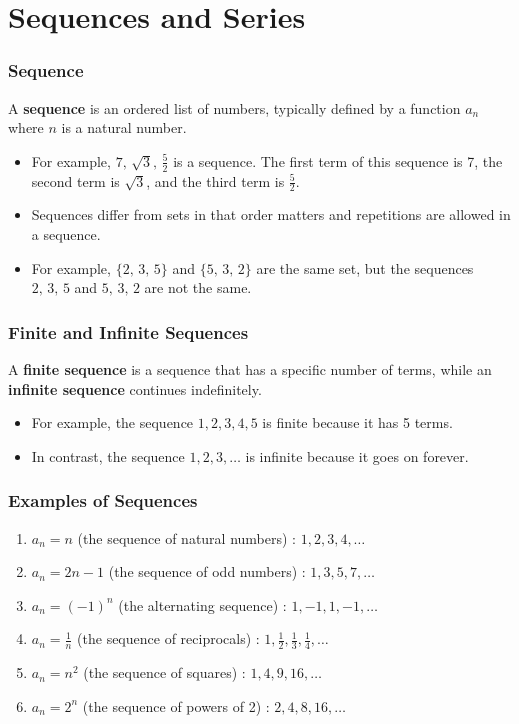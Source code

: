 \section{Sequences and Series}
\label{sec:sequence-series}

\begin{frame}
    \frametitle{Sequence}
    \begin{definition}
        A \textbf{sequence} is an ordered list of numbers, typically defined by a function \( a_n \) where \( n \) is a natural number.     
    \end{definition}
\begin{itemize}
    \item For example, \(7,\, \sqrt{3},\, \frac{5}{2}\) is a sequence. The first term of this sequence is 7, the second term is \(\sqrt{3}\), and the third term is \(\frac{5}{2}\).
    \item Sequences differ from sets in that order matters and repetitions are allowed in a sequence.
    \item For example, \(\{2,\, 3,\, 5\}\) and \(\{5,\, 3,\, 2\}\) are the same set, but the sequences \(2,\, 3,\, 5\) and \(5,\, 3,\, 2\) are not the same.
\end{itemize}
\end{frame}

\begin{frame}
    \frametitle{Finite and Infinite Sequences}
    \begin{definition}
        A \textbf{finite sequence} is a sequence that has a specific number of terms, while an \textbf{infinite sequence} continues indefinitely.
    \end{definition}
    \begin{itemize}
        \item For example, the sequence \(1, 2, 3, 4, 5\) is finite because it has 5 terms.
        \item In contrast, the sequence \(1, 2, 3, \ldots\) is infinite because it goes on forever.
    \end{itemize}
\end{frame}

\begin{frame}
    \frametitle{Examples of Sequences} 
    \begin{enumerate}
        \item \(a_n = n\) (the sequence of natural numbers) : \(1, 2, 3, 4, \ldots\)
        \item \(a_n = 2n - 1\) (the sequence of odd numbers) : \(1, 3, 5, 7, \ldots\)
        \item \(a_n = (-1)^n\) (the alternating sequence) : \(1, -1, 1, -1, \ldots\)
        \item \(a_n = \frac{1}{n}\) (the sequence of reciprocals) : \(1, \frac{1}{2}, \frac{1}{3}, \frac{1}{4}, \ldots\)
        \item \(a_n = n^2\) (the sequence of squares) : \(1, 4, 9, 16, \ldots\)
        \item \(a_n = 2^n\) (the sequence of powers of 2) : \(2, 4, 8, 16, \ldots\)
    \end{enumerate}
\end{frame}

